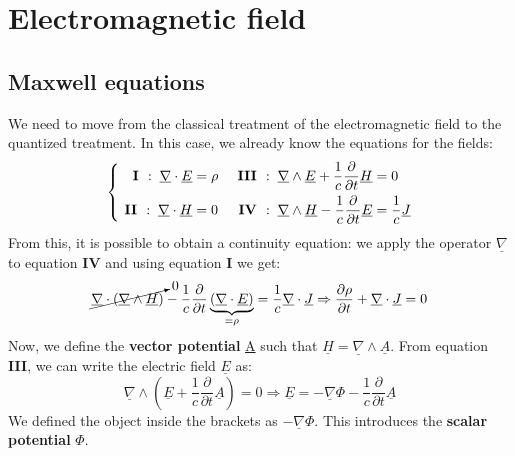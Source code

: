 \documentclass[../main.tex]{subfiles}
\begin{document}
\setchapterpreamble[u]{\margintoc}
\chapter[Electromagnetic field]{Electromagnetic field\footnotemark[0]}
\section{Maxwell equations}
We need to move from the classical treatment of the electromagnetic field to the quantized treatment. In this case, we already know the equations for the fields:
\[
\left\{
\begin{aligned}
\textbf{\RN{1}}:\;\underline{\nabla}\cdot\underline{E}&=\rho  &\textbf{\RN{3}}:\;\underline{\nabla}\wedge\underline{E}+\frac{1}{c}\frac{\partial}{\partial t}\underline{H}&=0\\
\textbf{\RN{2}}:\;\underline{\nabla}\cdot\underline{H}&=0  &\textbf{\RN{4}}:\;\underline{\nabla}\wedge\underline{H}-\frac{1}{c}\frac{\partial}{\partial t}\underline{E}&=\frac{1}{c}\underline{J}
\end{aligned}
\right.
\]
From this, it is possible to obtain a continuity equation: we apply the operator $\underline{\nabla}$ to equation \textbf{\RN{4}} and using equation \textbf{\RN{1}} we get:
\[
\cancelto{0}{\underline{\nabla}\cdot(\underline{\nabla}\wedge\underline{H})}-\frac{1}{c}\frac{\partial}{\partial t}\underbrace{(\underline{\nabla}\cdot\underline{E})}_{=\rho}=\frac{1}{c}\underline{\nabla}\cdot\underline{J}\Rightarrow\frac{\partial\rho}{\partial t}+\underline{\nabla}\cdot\underline{J}=0
\]
Now, we define the \textbf{vector potential} \underline{A} such that $\underline{H}=\underline{\nabla}\wedge\underline{A}$. From equation \textbf{\RN{3}}, we can write the electric field $\underline{E}$ as:
\[
\underline{\nabla}\wedge\left(\underline{E}+\frac{1}{c}\frac{\partial}{\partial t}\underline{A}\right)=0\Rightarrow\underline{E}=-\underline{\nabla}\Phi-\frac{1}{c}\frac{\partial}{\partial t}\underline{A}
\]
We defined the object inside the brackets as $-\underline{\nabla}\Phi$. This introduces the \textbf{scalar potential} $\Phi$.
\end{document}
